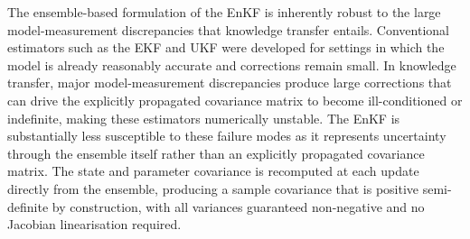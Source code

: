 {\color{blue} The ensemble-based formulation of the EnKF is inherently robust to the large model-measurement discrepancies that knowledge transfer entails. Conventional estimators such as the EKF and UKF were developed for settings in which the model is already reasonably accurate and corrections remain small. In knowledge transfer, major model-measurement discrepancies produce large corrections that can drive the explicitly propagated covariance matrix to become ill-conditioned or indefinite, making these estimators numerically unstable. The EnKF is substantially less susceptible to these failure modes as it represents uncertainty through the ensemble itself rather than an explicitly propagated covariance matrix. The state and parameter covariance is recomputed at each update directly from the ensemble, producing a sample covariance that is positive semi-definite by construction, with all variances guaranteed non-negative and no Jacobian linearisation required.}

